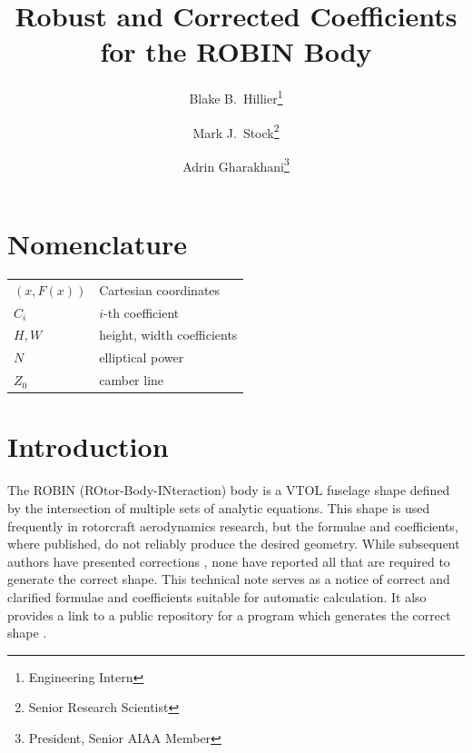 \documentclass[journal]{new-aiaa}
\title{Robust and Corrected Coefficients for the ROBIN Body}
\author{Blake B.~Hillier\footnote{Engineering Intern}}
\author{Mark J.~Stock\footnote{Senior Research Scientist}}
\author{Adrin Gharakhani\footnote{President, Senior AIAA Member}}
\affil{Applied Scientific Research, Inc.\\ Irvine, CA}
\begin{document}
\maketitle


\section*{Nomenclature}

{\renewcommand\arraystretch{1.0}
\noindent\begin{longtable*}{@{}l @{\quad=\quad} l@{}}
$(x, F(x))$  & Cartesian coordinates \\
$C_{i}$ &    $i$-th coefficient \\
$H,W$ &    height, width coefficients \\
$N$ &    elliptical power \\
$Z_{0}$ &    camber line \\
\end{longtable*}}


\section{Introduction}
The ROBIN (ROtor-Body-INteraction) body is a VTOL fuselage shape \cite{nasa87762,mineckgorton,nasa80051,nasa1999}
defined by the intersection of multiple sets of analytic equations.
This shape is used frequently in rotorcraft aerodynamics research, but the formulae and
coefficients, where published, do not reliably produce the desired geometry.
While subsequent authors have presented corrections \cite{nasa87762,mineckgorton},
none have reported all that are required to generate the correct shape.
This technical note serves as a notice of correct and clarified formulae and coefficients
suitable for automatic calculation. It also provides a link to a public repository
for a program which generates the correct shape \cite{robinsurfmesh}.

\end{document}
